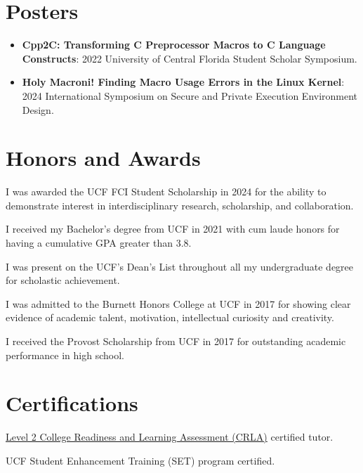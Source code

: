 \documentclass{article}
\newcommand{\resumeItem}[2]{
  \item\small{
    \textbf{#1}{: #2 \vspace{-2pt}}
  }
}
\newcommand{\resumeSubItem}[2]{\resumeItem{#1}{#2}\vspace{-3pt}}
\newcommand{\resumeSubHeadingListStart}{\begin{itemize}[leftmargin=*, label={}]}
\newcommand{\resumeSubHeadingListEnd}{\end{itemize}}
\begin{document}
\vspace{-5pt}
\section{Posters}
\resumeSubHeadingListStart{}
\resumeSubItem{Cpp2C\@: Transforming C Preprocessor Macros to C Language Constructs}
{2022 University of Central Florida Student Scholar Symposium.}
\resumeSubItem{Holy Macroni! Finding Macro Usage Errors in the Linux Kernel}
{2024 International Symposium on Secure and Private Execution Environment Design.}
\resumeSubHeadingListEnd{}

\vspace{-5pt}
\section{Honors and Awards}
\begin{description}[font=$\bullet$]
	\item {I was awarded the UCF FCI Student Scholarship in 2024 for the ability to demonstrate interest in interdisciplinary research, scholarship, and collaboration.}
	\vspace{-5pt}
	\item {I received my Bachelor's degree from UCF in 2021 with cum laude honors for having a cumulative GPA greater than 3.8.}
	\vspace{-5pt}
	\item {I was present on the UCF's Dean's List throughout all my undergraduate degree for scholastic achievement.}
	\vspace{-5pt}
	\item {I was admitted to the Burnett Honors College at UCF in 2017 for showing clear evidence of academic talent, motivation, intellectual curiosity and creativity.}
	\vspace{-5pt}
	\item {I received the Provost Scholarship from UCF in 2017 for outstanding academic performance in high school.}
\end{description}

\vspace{-5pt}
\section{Certifications}
\begin{description}[font=$\bullet$]
	\item {\href{https://drive.google.com/file/d/1idZ5hhQQF4f-ZRQCBUplQTGU9YjS7fUs/view?usp=sharing}{Level 2 College Readiness and Learning Assessment (CRLA)} certified tutor.}
	      \vspace{-5pt}
	\item {UCF Student Enhancement Training (SET) program certified.}
\end{description}
\end{document}

